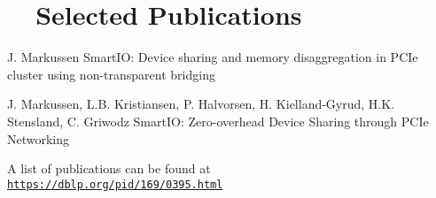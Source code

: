 \section[Selected Publications]{\faBook[regular]~~Selected Publications}
    {J. Markussen}
    {SmartIO: Device sharing and memory disaggregation in PCIe cluster using non-transparent bridging}

    {J. Markussen, L.B. Kristiansen, P. Halvorsen, H. Kielland-Gyrud, H.K. Stensland, C. Griwodz}
    {SmartIO: Zero-overhead Device Sharing through PCIe Networking}

%	
%
%

A list of publications can be found at\\
\texttt{\href{https://dblp.org/pid/169/0395.html}{https://dblp.org/pid/169/0395.html}}

